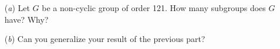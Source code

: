 \documentclass[12pt,letterpaper,boxed]{hmcpset}
\begin{document}
\begin{solution}
\end{solution}

\clearpage

\begin{problem}[5.2.4]
\begin{itemize}
  \item[(\textit{a})] Let $G$ be a non-cyclic group of order 121. How many subgroups does $G$ have? Why? 
  
  \item[(\textit{b})] Can you generalize your result of the previous part? 
\end{itemize}
\end{problem}

\begin{solution}

\end{solution}
\end{document}
